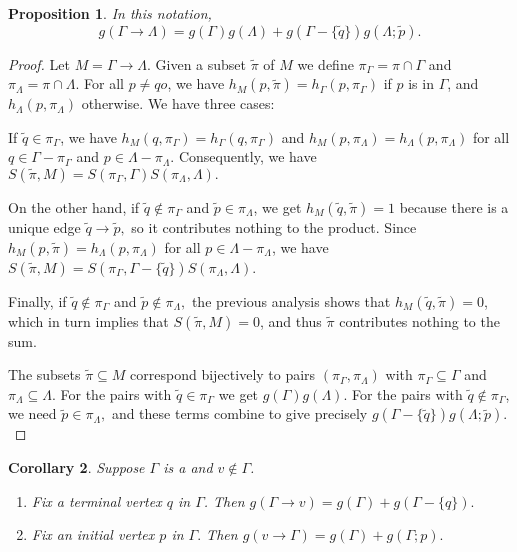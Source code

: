 \documentclass{article}
\newenvironment{enumrealm}{\setlength{\abovedisplayskip}{5pt}
\setlength{\belowdisplayskip}{5pt}}{\setlength{\abovedisplayskip}{10.0pt plus 2.0pt minus 5.0pt}
\setlength{\belowdisplayskip}{10.0pt plus 2.0pt minus 5.0pt}}
\newcommand{\qo}{\tilde{q}}
\newcommand{\pin}{\tilde{p}}
\newcommand{\tilpi}{\tilde{\pi}}
\newcommand{\piga}{\pi_\Gamma}
\newcommand{\pila}{\pi_\Lambda}
\theoremstyle{plain}
\newtheorem{prop}{Proposition}[section]
\newtheorem{cor}[prop]{Corollary}
\theoremstyle{definition}
\begin{document}
\begin{prop}
	In this notation, \begin{enumrealm}\begin{equation*} g(\Gamma \rightarrow \Lambda) = g(\Gamma)g(\Lambda) + g(\Gamma - \{\qo\})g(\Lambda; \pin). \end{equation*}\end{enumrealm}
\end{prop}
\begin{proof}
	Let $M = \Gamma \rightarrow \Lambda.$ Given a subset $\tilpi$ of $M$ we define $\piga = \pi \cap \Gamma$ and $\pila = \pi \cap \Lambda$. For all $p \neq qo$, we have $h_M(p, \tilpi) = h_\Gamma(p, \piga)$ if $p$ is in $\Gamma$, and $h_\Lambda(p, \pila)$ otherwise. We have three cases:
	
	
	If $\qo \in \piga$, we have $h_M(q, \piga) = h_\Gamma(q, \piga)$ and $h_M(p, \pila) = h_\Lambda(p, \pila)$ for all $q \in \Gamma - \piga$ and $p \in \Lambda - \pila$. Consequently, we have $S(\tilpi, M) = S(\piga, \Gamma)S(\pila, \Lambda).$
	
	On the other hand, if $\qo\notin\piga$ and $\pin \in \pila$, we get $h_M(\qo, \tilpi) = 1$ because there is a unique edge $\qo \rightarrow \pin,$ so it contributes nothing to the product. Since $h_M(p, \tilpi) = h_\Lambda(p, \pila)$ for all $p \in \Lambda - \pila$, we have $S(\tilpi, M) = S(\piga, \Gamma - \{\qo\})S(\pila, \Lambda)$.
	
	Finally, if $\qo \notin \piga$ and $\pin\notin\pila,$ the previous analysis shows that $h_M(\qo, \tilpi) = 0$, which in turn implies that $S(\tilpi, M) = 0$, and thus $\tilpi$ contributes nothing to the sum.
	
	The subsets $\tilpi \subseteq M$ correspond bijectively to pairs $(\piga, \pila)$ with $\piga \subseteq \Gamma$ and $\pila \subseteq \Lambda.$ For the pairs with $\qo \in \piga$ we get $g(\Gamma)g(\Lambda)$. For the pairs with $\qo \notin \piga$, we need $\pin \in \pila,$ and these terms combine to give precisely $g(\Gamma - \{\qo\})g(\Lambda; \pin).$
\end{proof}

\begin{cor} Suppose $\Gamma$ is a  and $v \notin \Gamma$.\listspace
	\begin{enumerate} \listspace
		\item Fix a terminal vertex $q$ in $\Gamma$. Then $g(\Gamma \rightarrow v) = g(\Gamma) + g(\Gamma - \{q\}).$
		\item Fix an initial vertex $p$ in $\Gamma.$ Then $g(v \rightarrow \Gamma) = g(\Gamma) + g(\Gamma; p).$
	\end{enumerate}\textspace
\end{cor}
\end{document}
